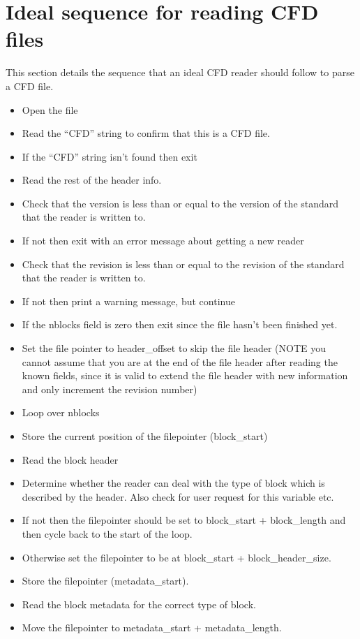 \documentclass[8pt]{article}
\begin{document}
\section{Ideal sequence for reading CFD files}
This section details the sequence that an ideal CFD reader should follow to parse a CFD file.
\begin{itemize}
\item Open the file
\item Read the ``CFD'' string to confirm that this is a CFD file.
\item If the ``CFD'' string isn't found then exit
\item Read the rest of the header info.
\item Check that the version is less than or equal to the version of the standard that the reader is written to.
\item If not then exit with an error message about getting a new reader
\item Check that the revision is less than or equal to the revision of the standard that the reader is written to.
\item If not then print a warning message, but continue
\item If the nblocks field is zero then exit since the file hasn't been finished yet.
\item Set the file pointer to header\_offset to skip the file header (NOTE you cannot assume that you are at the end of the file header after reading the known fields, since it is valid to extend the file header with new information and only increment the revision number)
\item Loop over nblocks
\item Store the current position of the filepointer (block\_start)
\item Read the block header
\item Determine whether the reader can deal with the type of block which is described by the header. Also check for user request for this variable etc.
\item If not then the filepointer should be set to block\_start + block\_length and then cycle back to the start of the loop.
\item Otherwise set the filepointer to be at block\_start + block\_header\_size.
\item Store the filepointer (metadata\_start).
\item Read the block metadata for the correct type of block.
\item Move the filepointer to metadata\_start + metadata\_length.

\end{itemize}
\end{document}
